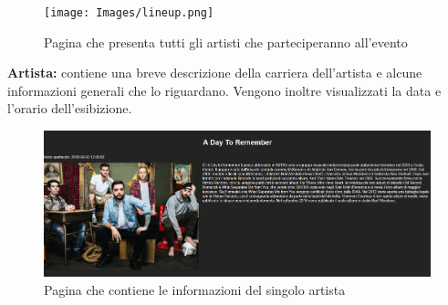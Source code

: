 \documentclass[10pt, a4paper]{article}
\begin{document}
\begin{figure}[h!]
  \centering
  \texttt{[image: Images/lineup.png]}
  \caption{Pagina che presenta tutti gli artisti che parteciperanno all'evento}
  \label{fig:lineup}
\end{figure}
\begin{flushleft} \textbf{Artista: }contiene una breve descrizione della carriera dell'artista e alcune informazioni generali che lo riguardano. Vengono inoltre visualizzati la data e l'orario dell'esibizione. \end{flushleft}
\begin{figure}[h!]
  \centering
  \includegraphics[width=1\textwidth]{Images/artista.png}
  \caption{Pagina che contiene le informazioni del singolo artista}
  \label{fig:artista}
\end{figure}
\end{document}
